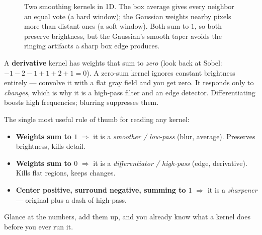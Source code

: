 \begin{figure}[H]
\centering
{}
\caption{Two smoothing kernels in 1D. The box average gives every neighbor an
equal vote (a hard window); the Gaussian weights nearby pixels more than distant
ones (a soft window). Both sum to $1$, so both preserve brightness, but the
Gaussian's smooth taper avoids the ringing artifacts a sharp box edge produces.}
\label{ch32:fig-blur-kernels}
\end{figure}

A \textbf{derivative} kernel has weights that sum to \emph{zero} (look back at
Sobel: $-1-2-1+1+2+1 = 0$). A zero-sum kernel ignores constant brightness
entirely --- convolve it with a flat gray field and you get zero. It responds
only to \emph{changes}, which is why it is a high-pass filter and an edge
detector. Differentiating boosts high frequencies; blurring suppresses them.

\begin{focusbox}
The single most useful rule of thumb for reading any kernel:
\begin{itemize}
\item \textbf{Weights sum to $1$} $\Rightarrow$ it is a \emph{smoother /
low-pass} (blur, average). Preserves brightness, kills detail.
\item \textbf{Weights sum to $0$} $\Rightarrow$ it is a \emph{differentiator /
high-pass} (edge, derivative). Kills flat regions, keeps changes.
\item \textbf{Center positive, surround negative, summing to $1$}
$\Rightarrow$ it is a \emph{sharpener} --- original plus a dash of high-pass.
\end{itemize}
Glance at the numbers, add them up, and you already know what a kernel does
before you ever run it.
\end{focusbox}

